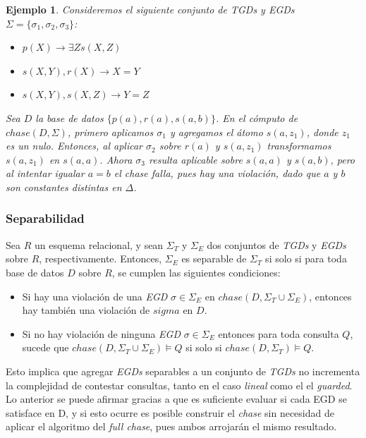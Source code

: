 \documentclass[11pt,a4paper,twoside]{tesis}
\newtheorem{exmp}{Ejemplo}
\begin{document}
\begin{exmp}
Consideremos el siguiente conjunto de TGDs y EGDs $\Sigma = \{\sigma_1, \sigma_2, \sigma_3\}$:

\begin{itemize}
    \item [$\sigma_1:$] $p(X) \rightarrow \exists Z s(X, Z)$
    \item [$\sigma_2:$] $s(X, Y), r(X)  \rightarrow X = Y$
    \item [$\sigma_3:$] $s(X, Y), s(X, Z) \rightarrow Y = Z$
\end{itemize}

Sea $D$ la base de datos $\{p(a), r(a), s(a, b)\}$. En el cómputo de $chase(D, \Sigma)$, primero aplicamos $\sigma_1$ y agregamos el átomo $s(a, z_1)$, donde $z_1$ es un nulo. Entonces, al aplicar $\sigma_2$ sobre $r(a)$ y $s(a, z_1)$ transformamos $s(a, z_1)$ en $s(a, a)$. Ahora $\sigma_3$ resulta aplicable sobre $s(a, a)$ y $s(a, b)$, pero al intentar igualar $a = b$ el \textit{chase} falla, pues hay una violación, dado que $a$ y $b$ son constantes distintas en $\Delta$.
\end{exmp}

\subsubsection{Separabilidad}
Sea $R$ un esquema relacional, y sean $\Sigma_T$ y $\Sigma_E$ dos conjuntos de \textit{TGDs} y \textit{EGDs} sobre $R$, respectivamente. Entonces, $\Sigma_E$ es separable de $\Sigma_T$ si solo si para toda base de datos $D$ sobre $R$, se cumplen las siguientes condiciones: 
\begin{itemize}
    \item  Si hay una violación de una \textit{EGD} $\sigma \in \Sigma_E$ en $chase(D, \Sigma_T \cup \Sigma_E)$, entonces hay también una violación de $sigma$ en $D$.
    \item Si no hay violación de ninguna \textit{EGD} $\sigma \in \Sigma_E$ entonces para toda consulta $Q$, sucede que $chase(D, \Sigma_T \cup \Sigma_E) \models Q$ si solo si $chase(D, \Sigma_T) \models Q$.
\end{itemize}

Esto implica que agregar \textit{EGDs} separables a un conjunto de \textit{TGDs} no incrementa la complejidad de contestar consultas, tanto en el caso \textit{lineal} como el el \textit{guarded}. Lo anterior se puede afirmar gracias a que es suficiente evaluar si cada EGD se satisface en D, y si esto ocurre es posible construir el \textit{chase} sin necesidad de aplicar el algoritmo del \textit{full chase}, pues ambos arrojarán el mismo resultado.
\end{document}

